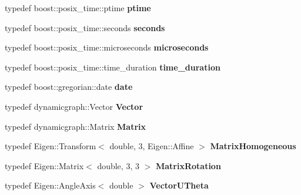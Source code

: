 \begin{DoxyCompactItemize}
typedef boost\+::posix\+\_\+time\+::ptime {\bfseries ptime}
\item 
\mbox{\label{namespacedynamic__graph_a6b06a10863ed1b2411191a895621dbb0}} 
typedef boost\+::posix\+\_\+time\+::seconds {\bfseries seconds}
\item 
\mbox{\label{namespacedynamic__graph_a4244ef24ba8efe2112a5535fd562e8b4}} 
typedef boost\+::posix\+\_\+time\+::microseconds {\bfseries microseconds}
\item 
\mbox{\label{namespacedynamic__graph_a4be0df79b9608a71968778c85d4a5f25}} 
typedef boost\+::posix\+\_\+time\+::time\+\_\+duration {\bfseries time\+\_\+duration}
\item 
\mbox{\label{namespacedynamic__graph_a1a7a95fd96c4e7f1b829260880f14d91}} 
typedef boost\+::gregorian\+::date {\bfseries date}
\item 
\mbox{\label{namespacedynamic__graph_a2df237966b015fea47c58c7778cc9a73}} 
typedef dynamicgraph\+::\+Vector {\bfseries Vector}
\item 
\mbox{\label{namespacedynamic__graph_a58a622fc51830acb132d3a3f18115374}} 
typedef dynamicgraph\+::\+Matrix {\bfseries Matrix}
\item 
\mbox{\label{namespacedynamic__graph_a1131a4277bbf44a6821d55f61a81c63e}} 
typedef Eigen\+::\+Transform$<$ double, 3, Eigen\+::\+Affine $>$ {\bfseries Matrix\+Homogeneous}
\item 
\mbox{\label{namespacedynamic__graph_ad658deb7372b70df382e1c8317a5a4b4}} 
typedef Eigen\+::\+Matrix$<$ double, 3, 3 $>$ {\bfseries Matrix\+Rotation}
\item 
\mbox{\label{namespacedynamic__graph_aabaea0c174dde41c755e8d3fb6d23caa}} 
typedef Eigen\+::\+Angle\+Axis$<$ double $>$ {\bfseries Vector\+U\+Theta}
\item 
\mbox{\label{namespacedynamic__graph_a9f22f1c9369a98e94778717faeec3f4b}} 

\end{DoxyCompactItemize}
